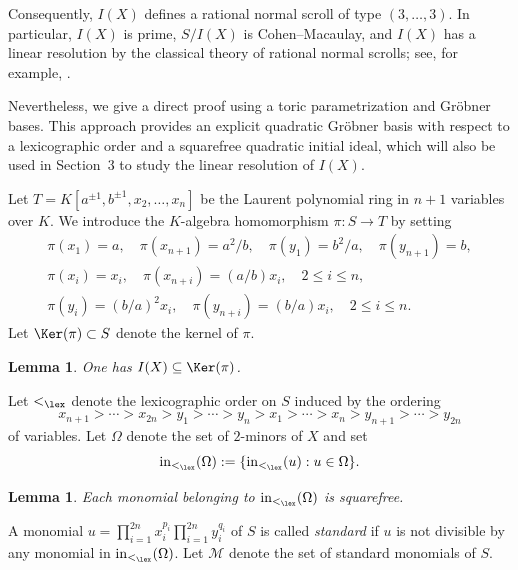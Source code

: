 \documentclass[12pt]{amsart}
\numberwithin{equation}{section}
\newcommand{\cM}{\mathcal{M}}
\let\to=\rightarrow
\newtheorem{Lemma}[Theorem]{Lemma}
\begin{document}
Consequently, $I(X)$ defines a rational normal scroll
of type $(3,\ldots,3)$. In particular, $I(X)$ is prime,
$S/I(X)$ is Cohen--Macaulay, and $I(X)$ has a linear
resolution by the classical theory of rational normal
scrolls; see, for example,
\cite[Chapter 6 and Appendix A2H]{EisenbudSyzygies}.

Nevertheless, we give a direct proof using a toric
parametrization and Gr\"obner bases. This approach
provides an explicit quadratic Gr\"obner basis with
respect to a lexicographic order and a squarefree
quadratic initial ideal, which will also be used
in Section~3 to study the linear resolution of $I(X)$.


Let $T=K[a^{\pm1},b^{\pm1},x_2,\ldots,x_n]$ be the Laurent polynomial ring in $n+1$ variables over $K$.  We introduce the $K$-algebra homomorphism $\pi : S \to T$ by setting
\begin{eqnarray*}
& \pi(x_1) = a, \quad \pi(x_{n+1}) = a^2/b, \quad \pi(y_1) = b^2/a, \quad \pi(y_{n+1}) = b, &\\
& \pi(x_{i}) = x_i, \quad \pi(x_{n+i}) = (a/b) x_i, \quad 2 \leq i \leq n,& \\
& \pi(y_{i}) = (b/a)^2 x_i, \quad \pi(y_{n+i}) = (b/a)x_i, \quad 2 \leq i \leq n.&
\end{eqnarray*}
Let $\Ker({\pi}) \subset S$ denote the kernel of $\pi$.

    \begin{Lemma}
        One has $I(X) \subseteq \Ker(\pi)$.
    \end{Lemma}

    Let $<_{\lex}$ denote the lexicographic order \cite[Example 2.1.2 (a)]{HHgtm260} on $S$ induced by the ordering
    \[
    x_{n+1} > \cdots > x_{2n} > y_1 > \cdots > y_n > x_1 > \cdots > x_n > y_{n+1} > \cdots > y_{2n} 
    \]
of variables.  Let $\Omega$ denote the set of $2$-minors of $X$ and set
\[
{\rm in}_{<_{\lex}}(\Omega) := \{{\rm in}_{<_{\lex}}(u) : u \in \Omega\}.
\]

    \begin{Lemma}
    Each monomial belonging to ${\rm in}_{<_{\lex}}(\Omega)$ is squarefree.
    \end{Lemma}
    
A monomial $u=\prod_{i=1}^{2n} x_i^{p_i} \prod_{i=1}^{2n} y_i^{q_i}$ of $S$ is called {\em standard} if $u$ is not divisible by any monomial in ${\rm in}_{<_{\lex}}(\Omega)$.  Let $\cM$ denote the set of standard monomials of $S$.
\end{document}
